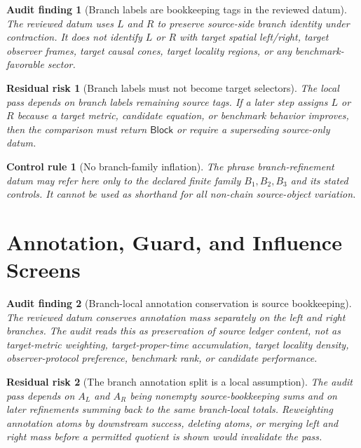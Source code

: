 \documentclass[11pt]{article}
\newcommand{\Block}{\mathsf{Block}}
\newtheorem{auditfinding}{Audit finding}
\newtheorem{residualrisk}{Residual risk}
\newtheorem{controlrule}{Control rule}
\begin{document}
\begin{auditfinding}[Branch labels are bookkeeping tags in the reviewed datum]
The reviewed datum uses \(L\) and \(R\) to preserve source-side branch
identity under contraction. It does not identify \(L\) or \(R\) with
target spatial left/right, target observer frames, target causal cones,
target locality regions, or any benchmark-favorable sector.
\end{auditfinding}

\begin{residualrisk}[Branch labels must not become target selectors]
The local pass depends on branch labels remaining source tags. If a later
step assigns \(L\) or \(R\) because a target metric, candidate equation,
or benchmark behavior improves, then the comparison must return
\(\Block\) or require a superseding source-only datum.
\end{residualrisk}

\begin{controlrule}[No branch-family inflation]
The phrase branch-refinement datum may refer here only to the declared
finite family \(B_{1},B_{2},B_{3}\) and its stated controls. It cannot be
used as shorthand for all non-chain source-object variation.
\end{controlrule}

\section{Annotation, Guard, and Influence Screens}

\begin{auditfinding}[Branch-local annotation conservation is source bookkeeping]
The reviewed datum conserves annotation mass separately on the left and
right branches. The audit reads this as preservation of source ledger
content, not as target-metric weighting, target-proper-time accumulation,
target locality density, observer-protocol preference, benchmark rank,
or candidate performance.
\end{auditfinding}

\begin{residualrisk}[The branch annotation split is a local assumption]
The audit pass depends on \(A_{L}\) and \(A_{R}\) being nonempty
source-bookkeeping sums and on later refinements summing back to the same
branch-local totals. Reweighting annotation atoms by downstream success,
deleting atoms, or merging left and right mass before a permitted
quotient is shown would invalidate the pass.
\end{residualrisk}
\end{document}
